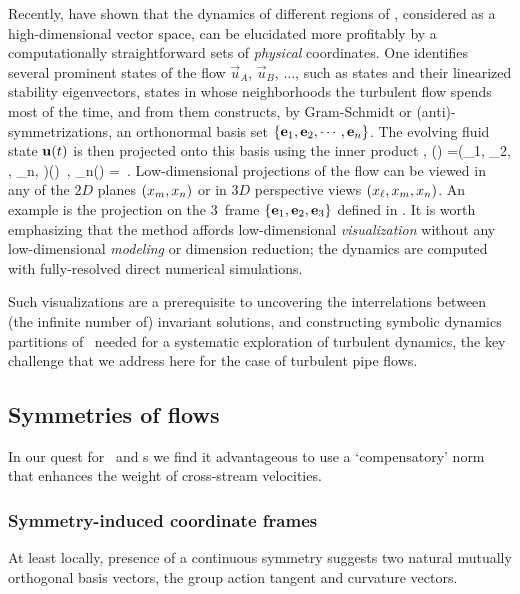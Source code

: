 Recently, \cite{GHCW07} have shown that the dynamics of different regions
of {\statesp}, considered as a high-dimensional vector space,
can be elucidated more profitably by a computationally
straight\-forward sets of \emph{physical} coordinates. One identifies
several prominent states of the flow $\vec{u}_A$, $\vec{u}_B$, $\dots$, such as
{\eqv} states and their linearized stability eigenvectors, states in whose neighborhoods the
turbulent flow spends most of the time, and from them constructs, by
Gram-Schmidt or (anti)-symmetrizations, an orthonormal basis set
$\{{\bf e}_1, {\bf e}_2, \cdots, {\bf e}_n\}$. The evolving fluid state ${\bf u}(t)$
is then projected onto this basis using the inner product
,
\beq
\ssp(\zeit) =(\ssp_1, \ssp_2, \cdots, \ssp_n, \cdots)(\zeit)
    \,,\qquad
\ssp_n(\zeit) = 
\,.
Low-dimensional projections of the flow can be viewed in any of the $2D$ planes
$(x_m, x_n)$ or in $3D$ perspective views $(x_{\ell},x_m,
x_n)$. An example is the  projection on
the $3$\dmn\ frame $\{{{\bf e}}_1,{{\bf e}}_2,{{\bf e}}_3\}$ defined in .
It is worth emphasizing that the method affords low-dimensional {\em
visualization} without any low-dimensional {\em modeling} or dimension
reduction; the dynamics are computed with fully-resolved direct numerical
simulations.

Such visualizations are a prerequisite to uncovering the
interrelations between (the infinite number of) invariant solutions, and
constructing symbolic dynamics partitions of \statesp\ needed for a
systematic exploration of turbulent dynamics, the key challenge that we
address here for the case of turbulent pipe flows.

\subsection{Symmetries of flows}
\label{s:symmFL}

In our quest for \reqva\ and \rpo s we
find it advantageous to use a `compensatory' norm %
that enhances the weight of cross-stream velocities.

\subsubsection{Symmetry-induced coordinate frames}
\label{s:symmIndCoo}

At least locally, presence of a continuous symmetry suggests two
natural mutually orthogonal basis vectors, the group action tangent and
curvature vectors.

